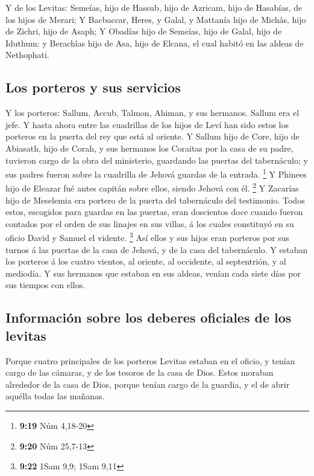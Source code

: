  Y de los Levitas: Semeías, hijo de Hassub, hijo de
Azricam, hijo de Hasabías, de los hijos de Merari;  Y
Bacbaccar, Heres, y Galal, y Mattanía hijo de Michâs, hijo de Zichri,
hijo de Asaph;  Y Obadías hijo de Semeías, hijo de Galal,
hijo de Iduthum: y Berachîas hijo de Asa, hijo de Elcana, el cual habitó
en las aldeas de Nethophati.

\hypertarget{los-porteros-y-sus-servicios}{%
\subsection{Los porteros y sus
servicios}\label{los-porteros-y-sus-servicios}}

 Y los porteros: Sallum, Accub, Talmon, Ahiman, y sus
hermanos. Sallum era el jefe.  Y hasta ahora entre las
cuadrillas de los hijos de Leví han sido estos los porteros en la puerta
del rey que está al oriente.  Y Sallum hijo de Core, hijo
de Abiasath, hijo de Corah, y sus hermanos los Coraitas por la casa de
su padre, tuvieron cargo de la obra del ministerio, guardando las
puertas del tabernáculo; y sus padres fueron sobre la cuadrilla de
Jehová guardas de la entrada. \footnote{\textbf{9:19} Núm 4,18-20}
 Y Phinees hijo de Eleazar fué antes capitán sobre ellos,
siendo Jehová con él. \footnote{\textbf{9:20} Núm 25,7-13} 
Y Zacarías hijo de Meselemia era portero de la puerta del tabernáculo
del testimonio.  Todos estos, escogidos para guardas en las
puertas, eran doscientos doce cuando fueron contados por el orden de sus
linajes en sus villas, á los cuales constituyó en su oficio David y
Samuel el vidente. \footnote{\textbf{9:22} 1Sam 9,9; 1Sam 9,11}
 Así ellos y sus hijos eran porteros por sus turnos á las
puertas de la casa de Jehová, y de la casa del tabernáculo.
 Y estaban los porteros á los cuatro vientos, al oriente,
al occidente, al septentrión, y al mediodía.  Y sus
hermanos que estaban en sus aldeas, venían cada siete días por sus
tiempos con ellos.

\hypertarget{informaciuxf3n-sobre-los-deberes-oficiales-de-los-levitas}{%
\subsection{Información sobre los deberes oficiales de los
levitas}\label{informaciuxf3n-sobre-los-deberes-oficiales-de-los-levitas}}

 Porque cuatro principales de los porteros Levitas estaban
en el oficio, y tenían cargo de las cámaras, y de los tesoros de la casa
de Dios.  Estos moraban alrededor de la casa de Dios,
porque tenían cargo de la guardia, y el de abrir aquélla todas las
mañanas.


